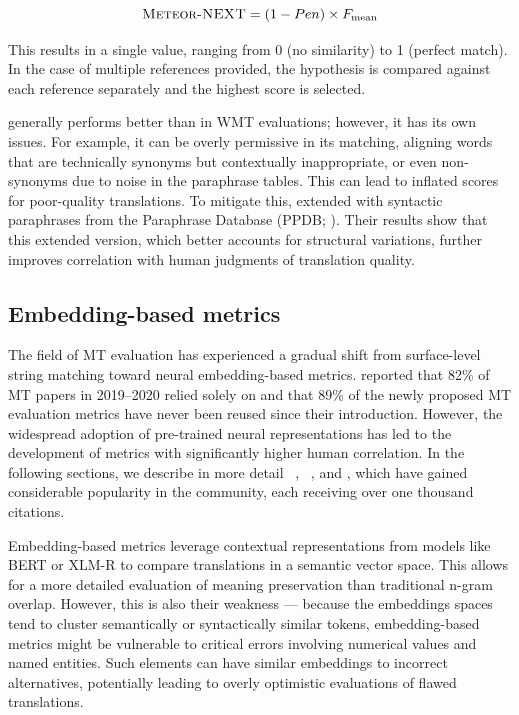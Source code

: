 $$
\text{\textsc{Meteor-NEXT}} = (1 - Pen) \times F_{\text{mean}} $$

This results in a single value, ranging from 0 (no similarity) to 1 (perfect match). In the case of multiple references provided, the hypothesis is compared against each reference separately and the highest score is selected. 

\mn generally performs better than \bleu in WMT evaluations; however, it has its own issues. For example, it can be overly permissive in its matching, aligning words that are technically synonyms but contextually inappropriate, or even non-synonyms due to noise in the paraphrase tables. This can lead to inflated scores for poor-quality translations. To mitigate this, \citet{guo-hu-2019-meteor} extended \mn with syntactic paraphrases from the Paraphrase Database (PPDB; \cite{pavlick-etal-2015-ppdb}). Their results show that this extended version, which better accounts for structural variations, further improves correlation with human judgments of translation quality.

\subsection{Embedding-based metrics}
The field of MT evaluation has experienced a gradual shift from surface-level string matching toward neural embedding-based metrics. \cite{marie-etal-2021-scientific} reported that 82\% of MT papers in 2019--2020 relied solely on \bleu and that 89\% of the newly proposed MT evaluation metrics have never been reused since their introduction. However, the widespread adoption of pre-trained neural representations has led to the development of metrics with significantly higher human correlation. In the following sections, we describe in more detail  \comet~\citep{rei-etal-2020-comet}, \bertscore~\citep{bertscore:2020}, and \bleurt \citep{sellam-etal-2020-bleurt}, which have gained considerable popularity in the community, each receiving over one thousand citations. 

Embedding-based metrics leverage contextual representations from models like BERT \cite{bert} or XLM-R \cite{xlm-r} to compare translations in a semantic vector space. This allows for a more detailed evaluation of meaning preservation than traditional n-gram overlap. However, this is also their weakness --- because the embeddings spaces tend to cluster semantically or syntactically similar tokens, embedding-based metrics might be vulnerable to critical errors involving numerical values and named entities. Such elements can have similar embeddings to incorrect alternatives, potentially leading to overly optimistic evaluations of flawed translations.

